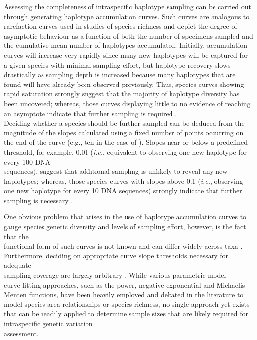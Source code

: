 Assessing the completeness of intraspecific haplotype sampling can be carried out through generating haplotype accumulation curves. Such curves are analogous to \\ rarefaction curves used in studies of species richness \cite{gotelli2001quantifying} and depict the degree of \\ asymptotic behaviour as a function of both the number of specimens sampled and the cumulative mean number of haplotypes accumulated. Initially, accumulation curves will increase very rapidly since many new haplotypes will be captured for a given species with minimal sampling effort, but haplotype recovery slows drastically as sampling depth is increased because many haplotypes that are found will have already been observed previously. Thus, species curves showing rapid saturation strongly suggest that the majority of haplotype diversity has been uncovered; whereas, those curves displaying little to no evidence of reaching an asymptote indicate that further sampling is required \cite{zhang2010estimating}. \\ Deciding whether a species should be further sampled can be deduced from the magnitude of the slopes calculated using a fixed number of points occurring on the end of the curve (e.g., ten in the case of \cite{phillips2015exploration, young2012revealing}). Slopes near or below a predefined threshold, for example, 0.01 (\textit{i.e.}, equivalent to observing one new haplotype for every 100 DNA \\ sequences), suggest that additional sampling is unlikely to reveal any  new haplotypes; whereas, those species curves with slopes above 0.1 (\textit{i.e.}, observing one new haplotype for every 10 DNA sequences) strongly indicate that further sampling is necessary \cite{hortal2005ed}. 



One obvious problem that arises in the use of haplotype accumulation curves to gauge species genetic diversity and levels of sampling effort, however, is the fact that the \\ functional form of such curves is not known and can differ widely across taxa \cite{phillips2015exploration}. \\ Furthermore, deciding on appropriate curve slope thresholds necessary for adequate \\ sampling coverage are largely arbitrary \cite{hortal2005ed}. While various parametric model \\ curve-fitting approaches, such as the power, negative exponential and Michaelis-Menten functions, have been heavily employed and debated in the literature to model species-area relationships \cite{dengler2009function, tjorve2003shapes} or species richness, no single approach yet exists that can be readily applied to determine sample sizes that are likely required for intraspecific genetic variation \\ assessment.



